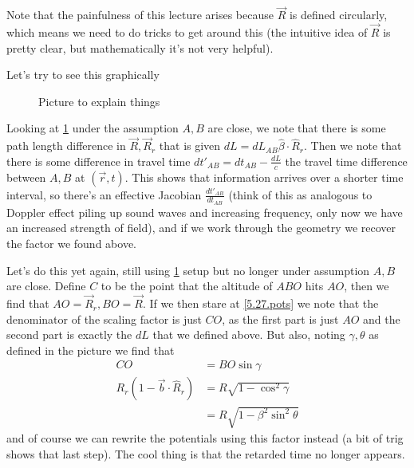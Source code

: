 \documentclass[10pt]{report}
\begin{document}
Note that the painfulness of this lecture arises because $\vec{R}$ is defined circularly, which means we need to do tricks to get around this (the intuitive idea of $\vec{R}$ is pretty clear, but mathematically it's not very helpful). 

Let's try to see this graphically
\begin{figure}[!h]
    \centering
    \caption{Picture to explain things}
    \label{5.27.pic}
\end{figure}

Looking at \ref{5.27.pic} under the assumption $A,B$ are close, we note that there is some path length difference in $\vec{R}, \vec{R}_r$ that is given $dL = dL_{AB}\hat{\beta} \cdot \hat{R}_r$. Then we note that there is some difference in travel time $dt'_{AB} = dt_{AB} - \frac{dL}{c}$ the travel time difference between $A,B$ at $(\vec{r},t)$. This shows that information arrives over a shorter time interval, so there's an effective Jacobian $\frac{dt'_{AB}}{dt_{AB}}$ (think of this as analogous to Doppler effect piling up sound waves and increasing frequency, only now we have an increased strength of field), and if we work through the geometry we recover the factor we found above.

Let's do this yet again, still using \ref{5.27.pic} setup but no longer under assumption $A,B$ are close. Define $C$ to be the point that the altitude of $ABO$ hits $AO$, then we find that $AO = \vec{R}_r, BO = \vec{R}$. If we then stare at \eqref{5.27.pots} we note that the denominator of the scaling factor is just $CO$, as the first part is just $AO$ and the second part is exactly the $dL$ that we defined above. But also, noting $\gamma,\theta$ as defined in the picture we find that
\begin{align}
    CO &= BO\sin\gamma\\
    R_r(1 - \vec{b}\cdot \hat{R}_r) &= R\sqrt{1 - \cos^2\gamma}\\
    &= R\sqrt{1 - \beta^2 \sin^2\theta}
\end{align}
and of course we can rewrite the potentials using this factor instead (a bit of trig shows that last step). The cool thing is that the retarded time no longer appears.
\end{document}
